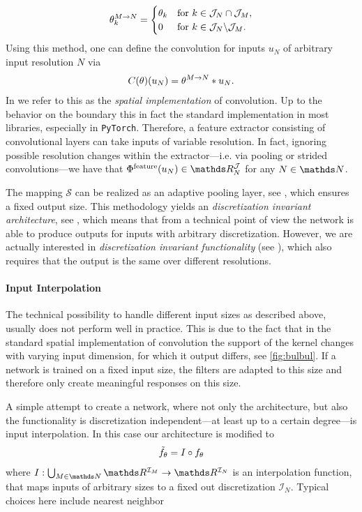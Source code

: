 %
\begin{align*}
\theta^{M \rightarrow N}_k = 
\begin{cases}
\theta_k & \text{for } k \in \mathcal{J}_N \cap \mathcal{J}_M,\\
0 & \text{for } k \in \mathcal{J}_N \backslash \mathcal{J}_M.
\end{cases}
\end{align*}
%
Using this method, one can define the convolution for inputs $u_N$ of arbitrary input resolution $N$ via
%
\begin{align*}
C(\theta)(u_N)= \theta^{M \rightarrow N} \ast u_N.
\end{align*}
%
In \cite{kabri2023resolution} we refer to this as the \emph{spatial implementation} of convolution. Up to the behavior on the boundary this in fact the standard implementation in most libraries, especially in \texttt{PyTorch}. Therefore, a feature extractor consisting of convolutional layers can take inputs of variable resolution. In fact, ignoring possible resolution changes within the extractor---i.e. via pooling or strided convolutions---we have that $\Phi^{\text{feature}}(\img_N)\in \R^{\mathcal{J}}_N$ for any $N\in\N$.

The mapping $\mathcal{S}$ can be realized as an adaptive pooling layer, see \cite{paszke2019pytorch}, which ensures a fixed output size. This methodology yields an \emph{discretization invariant architecture}, see \cite{kabri2022FNO, kovachki2021universal, li2020fourier}, which means that from a technical point of view the network is able to produce outputs for inputs with arbitrary discretization. However, we are actually interested in \emph{discretization invariant functionality} (see \cite{kabri2022FNO, kovachki2021universal, li2020fourier}), which also requires that the output is the same over different resolutions.
%
\paragraph{Input Interpolation}
%
%
The technical possibility to handle different input sizes as described above, usually does not perform well in practice. This is due to the fact that in the standard spatial implementation of convolution the support of the kernel changes with varying input dimension, for which it output differs, see \cref{fig:bulbul}. If a network is trained on a fixed input size, the filters are adapted to this size and therefore only create meaningful responses on this size.

A simple attempt to create a network, where not only the architecture, but also the functionality is discretization independent---at least up to a certain degree---is input interpolation. In this case our architecture is modified to
%
\begin{align*}
\tilde {f}_\theta = I \circ f_\theta
\end{align*}
%
where $I:\bigcup_{M\in\N} \R^{\mathcal{I}_M} \to \R^{\mathcal{I}_N}$ is an interpolation function, that maps inputs of arbitrary sizes to a fixed out discretization $\mathcal{I}_N$. Typical choices here include nearest neighbor 
%
%
